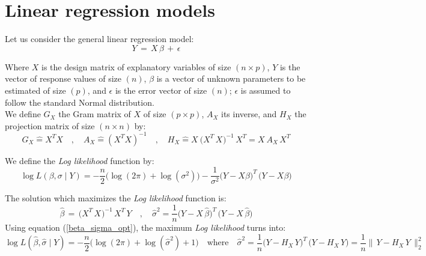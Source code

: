%

\section{Linear regression models}

Let us consider the general linear regression model:
\begin{equation}
\boxed{
Y \,=\, X \,\beta\, +\, \epsilon }
\end{equation}

Where $X$ is the design matrix of explanatory variables of size $(n \times p)$,
$Y$ is the vector of response values of size $(n)$,
$\beta$ is a vector of unknown parameters to be estimated of size $(p)$,
and $\epsilon $ is the error vector of size $(n)$; $\epsilon$ is assumed to follow the standard Normal distribution.\\


We define $G_X$ the Gram matrix of $X$ of size $(p\times p)$, $A_X$ its inverse,
and $H_X$ the projection matrix of size $(n\times n)$ by:
\begin{equation}
G_X \hat{=}X^T X  \quad,\quad  A_X \hat{=}(X^T X)^{-1}  \quad,\quad
H_X \hat{=} X_{}\,\big(X^T_{} \,X_{}\big)^{-1} \,X^T_{}  =  X_{}\,A_X \,X^T_{}
 \end{equation}

We define the \emph{Log likelihood} function by:
\begin{equation}
\log L(\beta,\sigma\mid Y)= -\frac{n}{2}\big(\log(2\pi)+ \log(\sigma^2)\big)- \frac{1}{\sigma^2}\big(Y-X\beta\big)^T\,\big(Y-X\beta\big)
\end{equation}

The solution which maximizes the \emph{Log likelihood} function is:
\begin{equation}
\label{beta_sigma_opt}
  \hat{\beta} \,=\, \big(X^T_{} \,X_{}\big)^{-1} \,X^T \, Y
\quad,\quad
\hat{\sigma}^2 = \frac{1}{n}\big(Y-X \,\hat{\beta}\big)^T\,\big(Y-X \,\hat{\beta}\big)
\end{equation}
Using equation (\ref{beta_sigma_opt}), the maximum \emph{Log likelihood} turns into:
\begin{equation}
\label{maxLogLikelihood}
\log L(\hat{\beta},\hat{\sigma}\mid Y)=-\frac{n}{2}\big(\log(2\pi)+ \log(\hat{\sigma}^2)+1\big)
\quad \text{where} \quad
\hat{\sigma}^2 = \frac{1}{n}\big(Y-H_X\,Y\big)^T\,\big(Y-H_X\,Y \big)=\frac{1}{n}\|\,Y-H_X\,Y\,\|^2_2
\end{equation}

